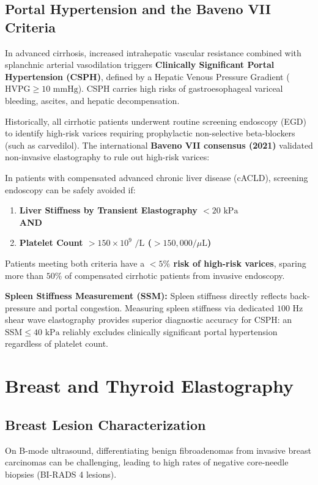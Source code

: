 \documentclass[11pt,a4paper]{article}
\begin{document}
\subsection{Portal Hypertension and the Baveno VII Criteria}
In advanced cirrhosis, increased intrahepatic vascular resistance combined with splanchnic arterial vasodilation triggers \textbf{Clinically Significant Portal Hypertension (CSPH)}, defined by a Hepatic Venous Pressure Gradient ($\text{HVPG} \ge 10\text{ mmHg}$). CSPH carries high risks of gastroesophageal variceal bleeding, ascites, and hepatic decompensation.

Historically, all cirrhotic patients underwent routine screening endoscopy (EGD) to identify high-risk varices requiring prophylactic non-selective beta-blockers (such as carvedilol). The international \textbf{Baveno VII consensus (2021)} validated non-invasive elastography to rule out high-risk varices:

\begin{clinicalpearl}
In patients with compensated advanced chronic liver disease (cACLD), screening endoscopy can be safely avoided if:
\begin{enumerate}
    \item \textbf{Liver Stiffness by Transient Elastography $< 20\text{ kPa}$} \\
    \textbf{AND}
    \item \textbf{Platelet Count $> 150 \times 10^9\text{ /L}$ ($> 150,000/\mu\text{L}$)}
\end{enumerate}
Patients meeting both criteria have a \textbf{$< 5\%$ risk of high-risk varices}, sparing more than $50\%$ of compensated cirrhotic patients from invasive endoscopy.

\textbf{Spleen Stiffness Measurement (SSM):} Spleen stiffness directly reflects back-pressure and portal congestion. Measuring spleen stiffness via dedicated $100\text{ Hz}$ shear wave elastography provides superior diagnostic accuracy for CSPH: an $\text{SSM} \le 40\text{ kPa}$ reliably excludes clinically significant portal hypertension regardless of platelet count.
\end{clinicalpearl}

\section{Breast and Thyroid Elastography}

\subsection{Breast Lesion Characterization}
On B-mode ultrasound, differentiating benign fibroadenomas from invasive breast carcinomas can be challenging, leading to high rates of negative core-needle biopsies (BI-RADS 4 lesions).
\end{document}
